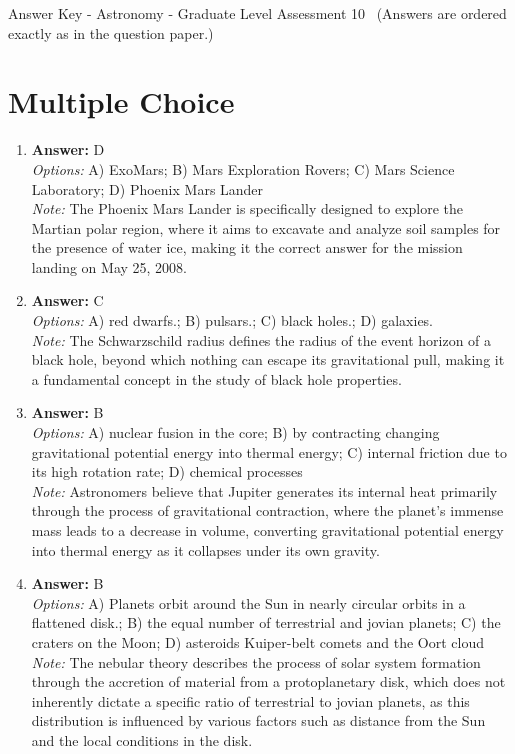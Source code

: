 \documentclass[12pt]{article}
\begin{document}
\begin{center}
Answer Key - Astronomy - Graduate Level Assessment 10 \
\small (Answers are ordered exactly as in the question paper.)
\end{center}

\section*{Multiple Choice}
\begin{enumerate}[label=\arabic*.]
\item \textbf{Answer:} D
\\ \textit{Options:} A) ExoMars; B) Mars Exploration Rovers; C) Mars Science Laboratory; D) Phoenix Mars Lander
\\ \textit{Note:} The Phoenix Mars Lander is specifically designed to explore the Martian polar region, where it aims to excavate and analyze soil samples for the presence of water ice, making it the correct answer for the mission landing on May 25, 2008.
\item \textbf{Answer:} C
\\ \textit{Options:} A) red dwarfs.; B) pulsars.; C) black holes.; D) galaxies.
\\ \textit{Note:} The Schwarzschild radius defines the radius of the event horizon of a black hole, beyond which nothing can escape its gravitational pull, making it a fundamental concept in the study of black hole properties.
\item \textbf{Answer:} B
\\ \textit{Options:} A) nuclear fusion in the core; B) by contracting changing gravitational potential energy into thermal energy; C) internal friction due to its high rotation rate; D) chemical processes
\\ \textit{Note:} Astronomers believe that Jupiter generates its internal heat primarily through the process of gravitational contraction, where the planet's immense mass leads to a decrease in volume, converting gravitational potential energy into thermal energy as it collapses under its own gravity.
\item \textbf{Answer:} B
\\ \textit{Options:} A) Planets orbit around the Sun in nearly circular orbits in a flattened disk.; B) the equal number of terrestrial and jovian planets; C) the craters on the Moon; D) asteroids Kuiper-belt comets and the Oort cloud
\\ \textit{Note:} The nebular theory describes the process of solar system formation through the accretion of material from a protoplanetary disk, which does not inherently dictate a specific ratio of terrestrial to jovian planets, as this distribution is influenced by various factors such as distance from the Sun and the local conditions in the disk.

\end{enumerate}
\end{document}
